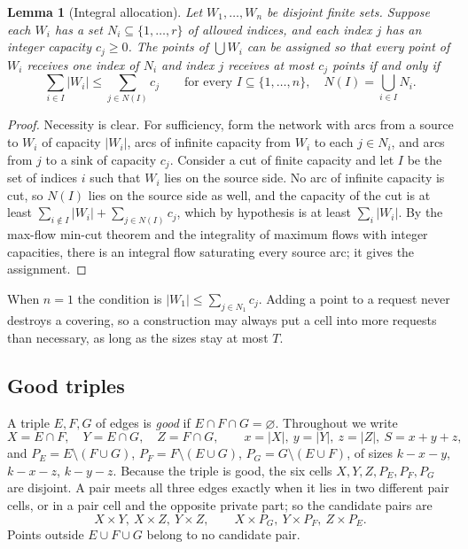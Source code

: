 \documentclass[11pt]{article}
\numberwithin{equation}{section}
\newtheorem{lemma}[theorem]{Lemma}
\theoremstyle{definition}
\theoremstyle{remark}
\begin{document}
\begin{lemma}[Integral allocation]\label{lem:allocation}
Let $W_1,\dots,W_n$ be disjoint finite sets. Suppose each $W_i$ has a
set $N_i\subseteq\{1,\dots,r\}$ of allowed indices, and each index $j$
has an integer capacity $c_j\ge0$. The points of $\bigcup W_i$ can be
assigned so that every point of $W_i$ receives one index of $N_i$ and
index $j$ receives at most $c_j$ points if and only if
\[
 \sum_{i\in I}|W_i|\le\sum_{j\in N(I)}c_j
 \qquad\text{for every } I\subseteq\{1,\dots,n\},\quad
 N(I)=\bigcup_{i\in I}N_i .
\]
\end{lemma}
\begin{proof}
Necessity is clear. For sufficiency, form the network with arcs from a
source to $W_i$ of capacity $|W_i|$, arcs of infinite capacity from $W_i$
to each $j\in N_i$, and arcs from $j$ to a sink of capacity $c_j$.
Consider a cut of finite capacity and let $I$ be the set of indices $i$
such that $W_i$ lies on the source side. No arc of infinite capacity is
cut, so $N(I)$ lies on the source side as well, and the capacity of the
cut is at least $\sum_{i\notin I}|W_i|+\sum_{j\in N(I)}c_j$, which by
hypothesis is at least $\sum_i|W_i|$. By the max-flow min-cut theorem and the integrality
of maximum flows with integer capacities, there is an integral flow
saturating every source arc; it gives the assignment.
\end{proof}

When $n=1$ the condition is $|W_1|\le\sum_{j\in N_1}c_j$. Adding a
point to a request never destroys a covering, so a construction may
always put a cell into more requests than necessary, as long as the
sizes stay at most $T$.

\subsection{Good triples}
A triple $E,F,G$ of edges is \emph{good} if $E\cap F\cap G=\varnothing$.
Throughout we write
\[
 X=E\cap F,\quad Y=E\cap G,\quad Z=F\cap G,\qquad
 x=|X|,\ y=|Y|,\ z=|Z|,\ S=x+y+z,
\]
and $P_E=E\setminus(F\cup G)$, $P_F=F\setminus(E\cup G)$,
$P_G=G\setminus(E\cup F)$, of sizes $k-x-y$, $k-x-z$, $k-y-z$. Because
the triple is good, the six cells $X,Y,Z,P_E,P_F,P_G$ are disjoint.
A pair meets all three edges exactly when it lies in two different pair
cells, or in a pair cell and the opposite private part; so the candidate
pairs are
\begin{equation}\label{eq:triplecand}
 X\times Y,\ X\times Z,\ Y\times Z,\qquad
 X\times P_G,\ Y\times P_F,\ Z\times P_E .
\end{equation}
Points outside $E\cup F\cup G$ belong to no candidate pair.
\end{document}
